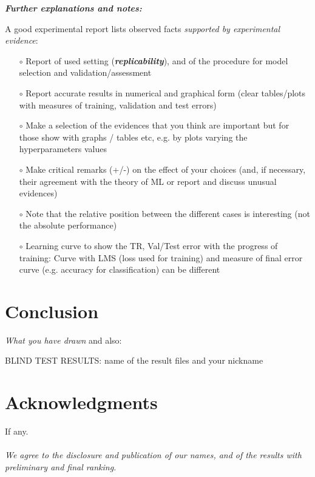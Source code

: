 \documentclass[12pt, letterpaper]{article}  %
\begin{document}
\noindent\textit{\textbf{Further explanations and notes:}}

{\footnotesize
A good experimental report lists observed facts \textit{supported by experimental evidence}:
\begin{itemize}
    \setlength\itemsep{-0.25em}
    \item[$\circ$] Report of used  setting (\textbf{\textit{replicability}}), and of the procedure for model selection and validation/assessment
    \item[$\circ$] Report accurate results in numerical and graphical form (clear tables/plots with measures of training, validation and test errors)
    \item[$\circ$] Make a selection of the evidences that you think are important but for those  show with graphs / tables etc, e.g. by plots varying the hyperparameters values
    \item[$\circ$] Make critical remarks (+/-) on the effect of your choices (and, if necessary, their agreement with the theory of ML or report and discuss unusual evidences)
    \item[$\circ$] Note that the relative position between the different cases is interesting (not the absolute performance)
    \item[$\circ$] Learning curve to show the TR, Val/Test error with the progress of training: Curve with LMS (loss used for training) and measure of final error curve (e.g. accuracy for classification) can be different
 
\end{itemize}

   }      %
        
\section{Conclusion}
\textit{What you have drawn} and also:

BLIND TEST RESULTS: name of the result files  and your nickname

\section*{Acknowledgments}
If any. \\ \\

\noindent\textit{We agree to the disclosure and publication of our names, and of the results with preliminary and final ranking.}
\end{document}
